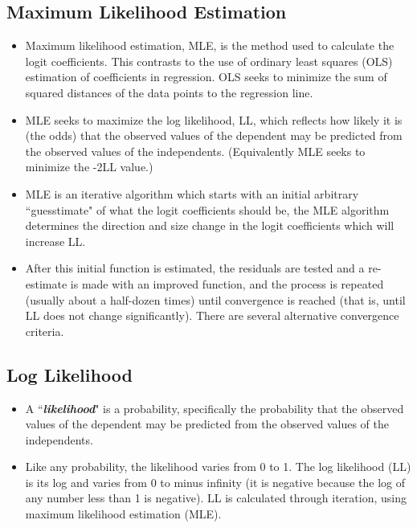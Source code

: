 \documentclass[a4paper,12pt]{article}
\begin{document}
\subsection{Maximum Likelihood Estimation}
\begin{itemize}
	\item Maximum likelihood estimation, MLE, is the method used to calculate the logit coefficients. This contrasts to the use of ordinary least squares (OLS) estimation of coefficients in regression. OLS seeks to minimize the sum of squared distances of the data points to the regression line. 
	\item MLE seeks to maximize the log likelihood, LL, which reflects how likely it is (the odds) that the observed values of the dependent may be predicted from the observed values of the independents. (Equivalently MLE seeks to minimize the -2LL value.)
	
\item 	MLE is an iterative algorithm which starts with an initial arbitrary ``guesstimate" of what the logit coefficients should be, the MLE algorithm determines the direction and size change in the logit coefficients which will increase LL.
\item  After this initial function is estimated, the residuals are tested and a re-estimate is made with an improved function, and the process is repeated (usually about a half-dozen times) until convergence is reached (that is, until LL does not change significantly). There are several alternative convergence criteria.
\end{itemize}



\subsection{Log Likelihood}
\begin{itemize}
	\item A ``\textbf{\textit{likelihood}}" is a probability, specifically the probability that the observed values of the dependent may be predicted from the observed values of the independents. 

\item Like any probability, the likelihood varies from 0 to 1. The log likelihood (LL) is its log and varies from 0 to minus infinity (it is negative because the log of any number less than 1 is negative). LL is calculated through iteration, using maximum likelihood estimation (MLE).
\end{itemize}
\end{document}
